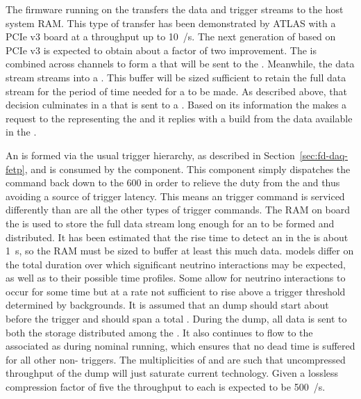 The firmware running on the   transfers the data
and trigger streams to the host system RAM. 
This type of transfer has been demonstrated by ATLAS with a PCIe v3
 board at a throughput up to \SI{10}{\GB/\s}. 
The next generation of  based on PCIe v3 is expected to
obtain about a factor of two improvement.
The  is combined across channels to form a
 that will be sent to the .
Meanwhile, the data stream streams into a . 
This buffer will be sized sufficient to retain the full data stream
for the period of time needed for a  to be made. 
As described above, that decision culminates in a 
that is sent to a . 
Based on its information the  makes a request to the
 representing the  and it replies with a
 build from the data available in the .

An   is formed via the usual trigger
hierarchy, as described in %
Section~\ref{sec:fd-daq-fetp},
and is consumed by the  component. 
This component simply dispatches the command back down to the \num{600}
 in order to relieve the duty from the  and
thus avoiding a source of trigger latency.
This means an  trigger command is serviced differently than
are all the other types of trigger commands. %
The RAM on board the  is used to store the full data
stream long enough for an   to be formed
and distributed. 
It has been estimated that the rise time to detect an  in
the   is about \SI{1}{\s}, so the RAM
must be sized to buffer at least this much data.
 models differ on the total duration over which significant
neutrino interactions may be expected, as well as to their possible
time profiles. 
Some allow for  neutrino interactions to occur for some
time but at a rate not sufficient to rise above a trigger threshold
determined by  backgrounds. 
It is assumed that an  dump should start about \snbpretime
before the  trigger and should span a total \snbtime.
During the dump, all data is sent to both the  storage
distributed among the . 
It also continues to flow to the associated  as during
nominal running, which ensures  that no dead time is suffered for all other
non- triggers. 
The multiplicities of  and  are such that
uncompressed throughput of the  dump will just saturate
current technology. 
Given a lossless compression factor of five the throughput to each  
is expected to be \SI{500}{\MB/\s}.

